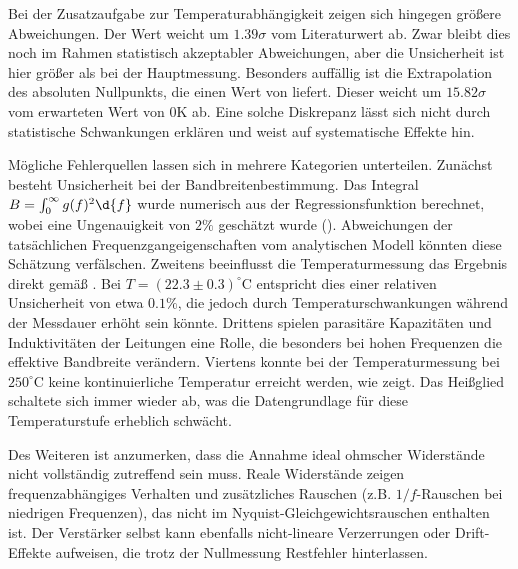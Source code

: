 Bei der Zusatzaufgabe zur Temperaturabhängigkeit zeigen sich hingegen größere Abweichungen. Der Wert
weicht um $1.39\sigma$ vom Literaturwert ab. Zwar bleibt dies noch im Rahmen statistisch akzeptabler Abweichungen, aber die Unsicherheit ist hier größer als bei der Hauptmessung. Besonders auffällig ist die Extrapolation des absoluten Nullpunkts, die einen Wert von
liefert. Dieser weicht um $15.82\sigma$ vom erwarteten Wert von $0\mathrm{K}$ ab. Eine solche Diskrepanz lässt sich nicht durch statistische Schwankungen erklären und weist auf systematische Effekte hin.

Mögliche Fehlerquellen lassen sich in mehrere Kategorien unterteilen. Zunächst besteht Unsicherheit bei der Bandbreitenbestimmung. Das Integral $B = \int_0^\infty g(f)^2\d{f}$ wurde numerisch aus der Regressionsfunktion berechnet, wobei eine Ungenauigkeit von $2\%$ geschätzt wurde (). Abweichungen der tatsächlichen Frequenzgangeigenschaften vom analytischen Modell könnten diese Schätzung verfälschen. Zweitens beeinflusst die Temperaturmessung das Ergebnis direkt gemäß . Bei $T = (22.3 \pm 0.3)^\circ\mathrm{C}$ entspricht dies einer relativen Unsicherheit von etwa $0.1\%$, die jedoch durch Temperaturschwankungen während der Messdauer erhöht sein könnte. Drittens spielen parasitäre Kapazitäten und Induktivitäten der Leitungen eine Rolle, die besonders bei hohen Frequenzen die effektive Bandbreite verändern. Viertens konnte bei der Temperaturmessung bei $250^\circ\mathrm{C}$ keine kontinuierliche Temperatur erreicht werden, wie  zeigt. Das Heißglied schaltete sich immer wieder ab, was die Datengrundlage für diese Temperaturstufe erheblich schwächt.

Des Weiteren ist anzumerken, dass die Annahme ideal ohmscher Widerstände nicht vollständig zutreffend sein muss. Reale Widerstände zeigen frequenzabhängiges Verhalten und zusätzliches Rauschen (z.B. $1/f$-Rauschen bei niedrigen Frequenzen), das nicht im Nyquist-Gleichgewichtsrauschen enthalten ist. Der Verstärker selbst kann ebenfalls nicht-lineare Verzerrungen oder Drift-Effekte aufweisen, die trotz der Nullmessung Restfehler hinterlassen.